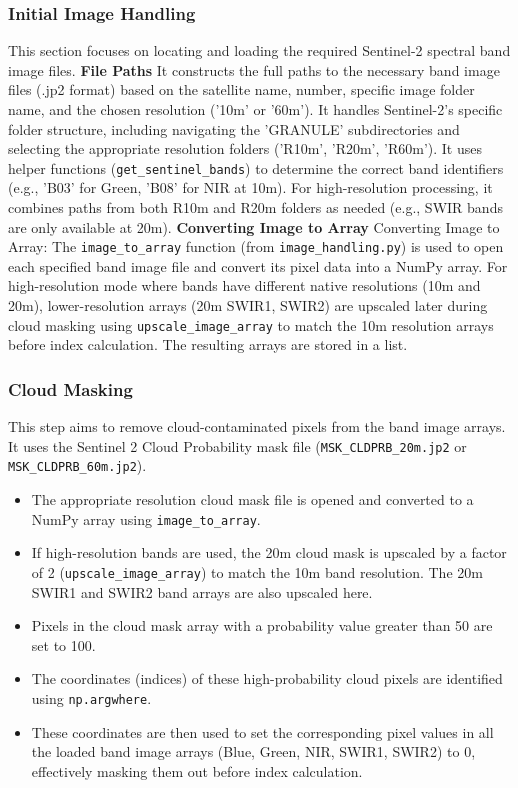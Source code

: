 \subsubsection{Initial Image Handling}
This section focuses on locating and loading the required Sentinel-2 spectral band image files.
\textbf{File Paths}
It constructs the full paths to the necessary band image files (.jp2 format) based on the satellite name, number, specific image folder name, and the chosen resolution ('10m' or '60m'). It handles Sentinel-2's specific folder structure, including navigating the 'GRANULE' subdirectories and selecting the appropriate resolution folders ('R10m', 'R20m', 'R60m'). It uses helper functions (\verb|get_sentinel_bands|) to determine the correct band identifiers (e.g., 'B03' for Green, 'B08' for NIR at 10m). For high-resolution processing, it combines paths from both R10m and R20m folders as needed (e.g., SWIR bands are only available at 20m).
\textbf{Converting Image to Array}
Converting Image to Array: The \verb|image_to_array| function (from \verb|image_handling.py|) is used to open each specified band image file and convert its pixel data into a NumPy array. For high-resolution mode where bands have different native resolutions (10m and 20m), lower-resolution arrays (20m SWIR1, SWIR2) are upscaled later during cloud masking using \verb|upscale_image_array| to match the 10m resolution arrays before index calculation. The resulting arrays are stored in a list.

\subsubsection{Cloud Masking}
This step aims to remove cloud-contaminated pixels from the band image arrays. It uses the Sentinel 2 Cloud Probability mask file (\verb|MSK_CLDPRB_20m.jp2| or \verb|MSK_CLDPRB_60m.jp2|). 
\begin{itemize}
    \item The appropriate resolution cloud mask file is opened and converted to a NumPy array using \verb|image_to_array|.
    \item If high-resolution bands are used, the 20m cloud mask is upscaled by a factor of 2 (\verb|upscale_image_array|) to match the 10m band resolution. The 20m SWIR1 and SWIR2 band arrays are also upscaled here.
    \item Pixels in the cloud mask array with a probability value greater than 50 are set to 100.
    \item The coordinates (indices) of these high-probability cloud pixels are identified using \verb|np.argwhere|.
    \item These coordinates are then used to set the corresponding pixel values in all the loaded band image arrays (Blue, Green, NIR, SWIR1, SWIR2) to 0, effectively masking them out before index calculation.
\end{itemize}

